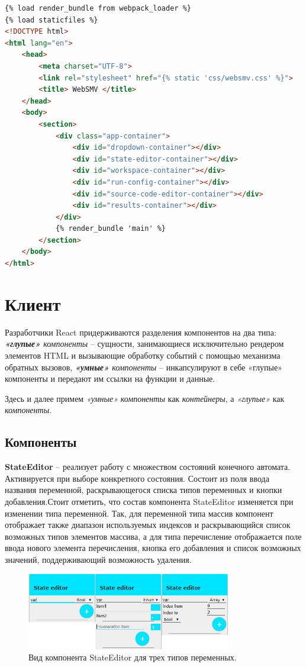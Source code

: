 \begin{lstlisting}[language=HTML, 
label=lst:template, 
caption={Файл main.html -- шаблон страницы.}]
{% load render_bundle from webpack_loader %}
{% load staticfiles %}
<!DOCTYPE html>
<html lang="en">
	<head>
		<meta charset="UTF-8">
		<link rel="stylesheet" href="{% static 'css/websmv.css' %}">
		<title> WebSMV </title>
	</head>
	<body>
		<section>
			<div class="app-container">
				<div id="dropdown-container"></div>
				<div id="state-editor-container"></div>
				<div id="workspace-container"></div>
				<div id="run-config-container"></div>
				<div id="source-code-editor-container"></div>
				<div id="results-container"></div>
			</div>
			{% render_bundle 'main' %}
		</section>
	</body>
</html>
\end{lstlisting}

\section{Клиент}\label{sec:client}

Разработчики React придерживаются разделения компонентов на два типа: \textit{\textbf{«глупые»} компоненты} -- сущности, занимающиеся исключительно рендером элементов HTML и вызывающие обработку событий с помощью механизма обратных вызовов, \textit{\textbf{«умные»} компоненты} -- инкапсулируют в себе «глупые» компоненты и передают им ссылки на функции и данные.

Здесь и далее примем \textit{«умные»} \textit{компоненты} как \textit{контейнеры}, а \textit{«глупые»} как \textit{компоненты}.

\subsection{Компоненты}

\textbf{StateEditor} -- реализует работу с множеством состояний конечного автомата. Активируется при выборе конкретного состояния. Состоит из поля ввода названия переменной, раскрывающегося списка типов переменных и кнопки добавления.Стоит отметить, что состав компонента StateEditor изменяется при изменении типа переменной. Так, для переменной типа массив компонент отображает также диапазон используемых индексов и раскрывающийся список возможных типов элементов массива, а для типа перечисление отображается поле ввода нового элемента перечисления, кнопка его добавления и список возможных значений, поддерживающий возможность удаления.


\begin{figure}[ht]
	\centering
	\includegraphics[width=0.8\textwidth]{fig/state_editor.png}
	\caption{Вид компонента StateEditor для трех типов переменных.}
	\label{fig:state_editor}
\end{figure}

